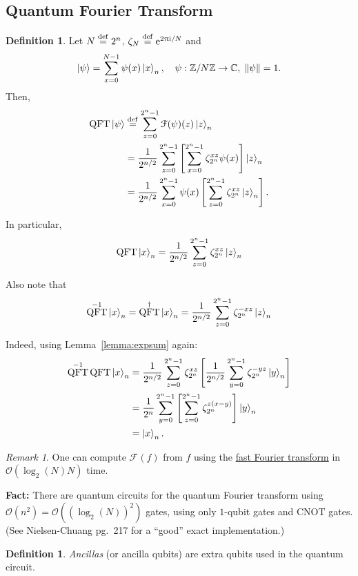 \documentclass[12pt]{amsart}
\theoremstyle{plain}
\theoremstyle{definition}
\newtheorem{definition}[theorem]{Definition}
\theoremstyle{remark}
\newtheorem*{remark}{Remark}
\newcommand{\mcal}{\mathcal}
\newcommand{\Z}{\mathbb{Z}}
\newcommand{\C}{\mathbb{C}}
\newcommand{\me}{\mathrm{e}}
\newcommand{\mi}{\mathrm{i}}
\newcommand{\mpi}{\uppi}
\newcommand{\idef}{\overset{{\rm def}}{=}}
\newcommand{\cnot}{\mathrm{CNOT}}  %
\newcommand{\adj}[1]{#1^{\dagger}}  %
\newcommand{\ft}{\mathcal{F}}  %
\DeclareMathOperator{\qft}{QFT}  %
\begin{document}
\subsection{Quantum Fourier Transform}

\begin{definition}
  Let $N \idef 2^n$, $\zeta_N \idef \me^{2 \mpi \mi/ N}$ and
  \[
    \ket{\psi} = \sum_{x=0}^{N-1} \psi(x) \ket{x}_n, \quad \psi : \Z/{N}\Z \to \C, \; \left\| \psi \right\| = 1.
  \]
  Then,
  \begin{align*}
    \qft \ket{\psi}
    &\idef \sum_{z=0}^{2^n-1}\ft(\psi)(z) \ket{z}_n \\
    &= \frac{1}{2^{n/2}}  \sum_{z=0}^{2^n - 1}\left[ \sum_{x=0}^{2^n-1} \zeta_{2^n}^{xz} \psi(x)\right] \ket{z}_n \\
    &= \frac{1}{2^{n/2}}  \sum_{x=0}^{2^n - 1} \psi(x) \left[ \sum_{z=0}^{2^n-1} \zeta_{2^n}^{xz} \ket{z}_n \right].
  \end{align*}
\end{definition}


In particular,
\[
  \qft \ket{x}_n = \frac{1}{2^{n/2}} \sum_{z=0}^{2^n-1} \zeta_{2^n}^{xz} \ket{z}_n
\]

Also note that
\[
  \qft^{-1} \ket{x}_n = \adj{\qft} \ket{x}_n = \frac{1}{2^{n/2}} \sum_{z=0}^{2^n-1} \zeta_{2^n}^{-xz} \ket{z}_n
\]

Indeed, using Lemma~\ref{lemma:expsum} again:
\begin{align*}
  \qft^{-1} \qft \ket{x}_n
  &=  \frac{1}{2^{n/2}} \sum_{z=0}^{2^n-1} \zeta_{2^n}^{xz} \left[  \frac{1}{2^{n/2}} \sum_{y=0}^{2^n-1} \zeta_{2^n}^{-yz} \ket{y}_n \right] \\
  &= \frac{1}{2^n} \sum_{y=0}^{2^n-1} \left[ \sum_{z=0}^{2^n - 1} \zeta_{2^n}^{z(x-y)}\right] \ket{y}_n \\
  &= \ket{x}_n.
\end{align*}

\begin{remark}
  One can compute $\ft(f)$ from $f$ using the \href{https://en.wikipedia.org/wiki/Fast_Fourier_transform}{fast Fourier transform} in $\mcal{O}(\log_2(N) N)$ time.
\end{remark}

\textbf{Fact:} There are quantum circuits for the quantum Fourier transform using $\mcal{O}(n^2) = \mcal{O}({(\log_2(N))}^2)$ gates, using only $1$-qubit gates and $\cnot$ gates.  (See Nielsen-Chuang pg.~217 for a ``good'' exact implementation.)


\begin{definition}
  \emph{Ancillas} (or ancilla qubits) are extra qubits used in the quantum circuit.
\end{definition}
\end{document}
